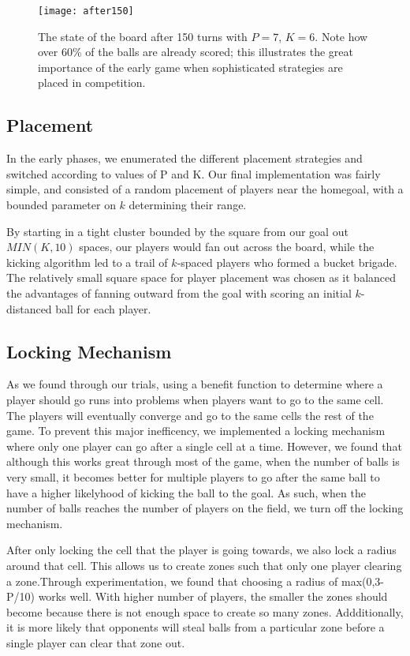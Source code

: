 \documentclass[
10pt, %
letterpaper, %
oneside, %
headinclude,footinclude, %
english
]{article}
\begin{document}
\begin{figure}[h!]
\centering 
\texttt{[image: after150]} 
\caption[State of a parallel football board after 150 turns]{The state of the board after 150 turns with $P=7$, $K=6$. Note how over 60\% of the balls are already scored; this illustrates the great importance of the early game when sophisticated strategies are placed in competition.}
\label{fig:gallery2} 
\end{figure}

\subsection{Placement}
In the early phases, we enumerated the different placement strategies and switched according to values of P and K. Our final implementation was fairly simple, and consisted of a random placement of players near the homegoal, with a bounded parameter on $k$ determining their range.

By starting in a tight cluster bounded by the square from our goal out $MIN(K,10)$ spaces, our players would fan out across the board, while the kicking algorithm led to a trail of $k$-spaced players who formed a bucket brigade. The relatively small square space for player placement was chosen as it balanced the advantages of fanning outward from the goal with scoring an initial $k$-distanced ball for each player.

\subsection{Locking Mechanism}
As we found through our trials, using a benefit function to determine where a player should go runs into problems when players want to go to the same cell. The players will eventually converge and go to the same cells the rest of the game. To prevent this major inefficency, we implemented a locking mechanism where only one player can go after a single cell at a time. However, we found that although this works great through most of the game, when the number of balls is very small, it becomes better for multiple players to go after the same ball to have a higher likelyhood of kicking the ball to the goal. As such, when the number of balls reaches the number of players on the field, we turn off the locking mechanism.

After only locking the cell that the player is going towards, we also lock a radius around that cell. This allows us to create zones such that only one player clearing a zone.Through experimentation, we found that choosing a radius of max(0,3-P/10) works well. With higher number of players, the smaller the zones should become because there is not enough space to create so many zones. Addditionally, it is more likely that opponents will steal balls from a particular zone before a single player can clear that zone out.
\end{document}
